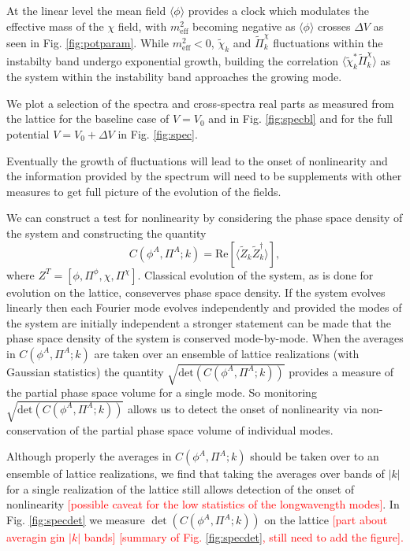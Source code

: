 At the linear level the mean field $\langle\phi\rangle$ provides a clock which modulates the effective mass of the $\chi$ field, with $m^2_\mathrm{eff}$ becoming negative as $\langle\phi\rangle$ crosses $\Delta V$ as seen in Fig. \ref{fig:potparam}. While $m^2_\mathrm{eff}<0$, $\tilde{\chi}_k$ and $\tilde{\Pi}^\chi_k$ fluctuations within the instabilty band undergo exponential growth, building the correlation $\langle\tilde{\chi}^*_k\tilde{\Pi}^\chi_k\rangle$ as the system within the instability band approaches the growing mode.

We plot a selection of the spectra and cross-spectra real parts as measured from the lattice for the baseline case of $V=V_0$ and in Fig. \ref{fig:specbl} and for the full potential $V=V_0 + \Delta V$ in Fig. \ref{fig:spec}.

\Fspecbl
\Fspec
\Fspecdet

Eventually the growth of fluctuations will lead to the onset of nonlinearity and the information provided by the spectrum will need to be supplements with other measures to get full picture of the evolution of the fields.

We can construct a test for nonlinearity by considering the phase space density of the system and constructing the quantity
\begin{equation}
  C(\phi^A,\Pi^A;k) =
  \mathrm{Re}\left[\langle\tilde{Z}_k\tilde{Z}_k^\dagger\rangle\right],
\end{equation}
where $Z^T=[\phi,\Pi^\phi,\chi,\Pi^\chi]$. Classical evolution of the system, as is done for evolution on the lattice, conseverves phase space density. If the system evolves linearly then each Fourier mode evolves independently and provided the modes of the system are initially independent a stronger statement can be made that the phase space density of the system is conserved mode-by-mode. When the averages in $C(\phi^A,\Pi^A;k)$ are taken over an ensemble of lattice realizations (with Gaussian statistics) the quantity $\sqrt{\mathrm{det}(C(\phi^A,\Pi^A;k))}$ provides a measure of the partial phase space volume for a single mode. So monitoring $\sqrt{\mathrm{det}(C(\phi^A,\Pi^A;k))}$ allows us to detect the onset of nonlinearity via non-conservation of the partial phase space volume of individual modes.

Although properly the averages in $C(\phi^A,\Pi^A;k)$ should be taken over to an ensemble of lattice realizations, we find that taking the averages over bands of $|k|$ for a single realization of the lattice still allows detection of the onset of nonlinearity \textcolor{red}{[possible caveat for the low statistics of the longwavength modes]}. In Fig. \ref{fig:specdet} we measure $\det(C(\phi^A,\Pi^A;k))$ on the lattice \textcolor{red}{[part about averagin gin $|k|$ bands]} \textcolor{red}{[summary of Fig. \ref{fig:specdet}, still need to add the figure].}

